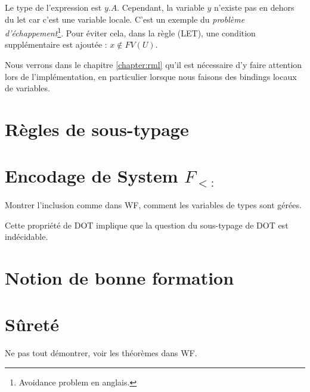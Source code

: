 Le type de l'expression est $y.A$. Cependant, la variable $y$ n'existe pas en
dehors du let car c'est une variable locale. C'est un exemple du
\textit{problème d'échappement}\footnote{\og Avoidance problem \fg \; en
anglais.}. Pour éviter cela, dans la règle (LET), une condition supplémentaire
est ajoutée : $x \notin FV(U)$.

Nous verrons dans le chapitre \ref{chapter:rml} qu'il est nécessaire d'y faire
attention lors de l'implémentation, en particulier lorsque nous faisons des
bindings locaux de variables.

\section{Règles de sous-typage}


\section{Encodage de System $F_{<:}$}

Montrer l'inclusion comme dans WF, comment les variables de types sont gérées.

Cette propriété de DOT implique que la question du sous-typage de DOT est
indécidable.

\section{Notion de bonne formation}


\section{Sûreté}

Ne pas tout démontrer, voir les théorèmes dans WF.